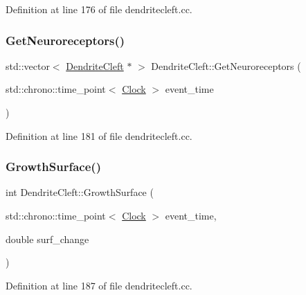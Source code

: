 Definition at line 176 of file dendritecleft.\+cc.

\mbox{\label{class_dendrite_cleft_a4a14361574777fb1d66fd4ed2d4f2492}} 
\subsubsection{\texorpdfstring{Get\+Neuroreceptors()}{GetNeuroreceptors()}}
{\footnotesize\ttfamily std\+::vector$<$ \mbox{\hyperlink{class_dendrite_cleft}{Dendrite\+Cleft}} $\ast$ $>$ Dendrite\+Cleft\+::\+Get\+Neuroreceptors (\begin{DoxyParamCaption}\item[{std\+::chrono\+::time\+\_\+point$<$ \mbox{\hyperlink{universe_8h_a0ef8d951d1ca5ab3cfaf7ab4c7a6fd80}{Clock}} $>$}]{event\+\_\+time }\end{DoxyParamCaption})}



Definition at line 181 of file dendritecleft.\+cc.

\mbox{\label{class_dendrite_cleft_af4715ffbf1bf437523d07e37b7abc3e0}} 
\subsubsection{\texorpdfstring{Growth\+Surface()}{GrowthSurface()}}
{\footnotesize\ttfamily int Dendrite\+Cleft\+::\+Growth\+Surface (\begin{DoxyParamCaption}\item[{std\+::chrono\+::time\+\_\+point$<$ \mbox{\hyperlink{universe_8h_a0ef8d951d1ca5ab3cfaf7ab4c7a6fd80}{Clock}} $>$}]{event\+\_\+time,  }\item[{double}]{surf\+\_\+change }\end{DoxyParamCaption})}



Definition at line 187 of file dendritecleft.\+cc.

